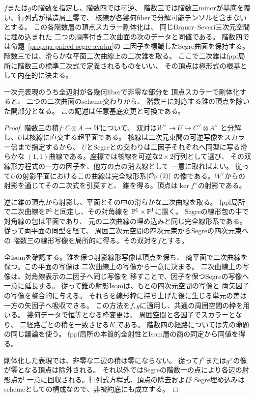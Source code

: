\begin{proposition}[階数三の積の相対幾何表示]
\label{prop:qa-square-rank-three-quadric-cones}
$f$または$g$の階数を指定し、階数四では可逆、
階数三では階数三minorが基底を覆い、行列式が構造層上零で、
核線が各幾何fiberで分解可能テンソルを含まないとする。
この各階数層の頂点スカラー剛体化は、
同じBrauer--Severi三次元空間に埋め込まれた
二つの順序付き二次曲面の次のデータと同値である。
階数四では命題~\ref{prop:qa-paired-segre-avatar}の
二因子を標識したSegre曲面を保持する。
階数三では、滑らかな平面二次曲線上の二次錐を取る。
ここで二次錐はfppf局所に階数三の標準二次式で定義されるものをいい、
その頂点は極形式の根基として内在的に決まる。

一次元表現のうち全辺射が各幾何fiberで非零な部分を
頂点スカラーで剛体化すると、
二つの二次曲面のscheme交わりから、
階数三に対応する錐の頂点を除いた開部分となる。
この記述は任意基底変更と可換である。
\end{proposition}
\begin{proof}
階数三の積$f:C\otimes A\to W$について、
双対は$W^\vee\twoheadrightarrow U\hookrightarrow C^\vee\otimes A^\vee$
と分解し、$U$は核線に直交する超平面である。
核線は二次元束間の可逆写像をスカラー倍まで指定するから、
$U$とSegreとの交わりは二因子それぞれへ同型に写る滑らかな
$(1,1)$曲線である。座標では核線を可逆な$2\times2$行列として選び、
その双線形方程式の一方の因子を、他方の点の消去線として
一意に取ればよい。
従って$U$の射影平面におけるこの曲線は完全線形系$|\mathcal O_{\mathbb P^1}(2)|$
の像である。$W^\vee$からの射影を通じてその二次式を引戻すと、
錐を得る。頂点は$\ker f^\vee$の射影である。

逆に錐の頂点から射影し、平面とその中の滑らかな二次曲線を取る。
fppf局所で二次曲線を$\mathbb P^1$と同定し、その対角線を
$\mathbb P^1\times\mathbb P^1$に置く。
Segreの線形包の中で対角線の包は平面であり、
元の二次曲線の埋め込みと同じ完全線形系である。
従って両平面の同型を経て、
周囲三次元空間の四次元束からSegreの四次元束への
階数三の線形写像を局所的に得る。その双対を$f$とする。

全Isomを確認する。錐を保つ射影線形写像は頂点を保ち、
商平面で二次曲線を保つ。この平面の写像は
二次曲線上の写像から一意に決まる。
二次曲線上の写像は、対角線表示の二因子へ同じ写像を
移すことで、因子を保つSegreの写像へ一意に延長する。
従って錐の射影Isomは、もとの四次元空間の写像と
両矢因子の写像を整合的に与える。
それらを線形枠に持ち上げた後に生じる単元の差は
一方の矢因子へ吸収できる。
この方法を$f,g$に適用し、共通の周囲空間の枠を用いる。
幾何データで恒等となる枠変更は、
周囲空間と各因子でスカラーとなり、
二経路ごとの積を一致させる$K_\square$である。
階数四の経路については先の命題の同じ議論を使う。
fppf局所の本質的全射性とIsom層の商の同定から同値を得る。

剛体化した表現では、非零な二辺の積は零にならない。
従って$f^\vee$または$g^\vee$の像が零となる頂点は除外される。
それ以外ではSegreの階数一の点により各辺の射影点が
一意に回収される。行列式方程式、頂点の除去および
Segre埋め込みはschemeとしての構成なので、非被約底にも成立する。
\end{proof}

